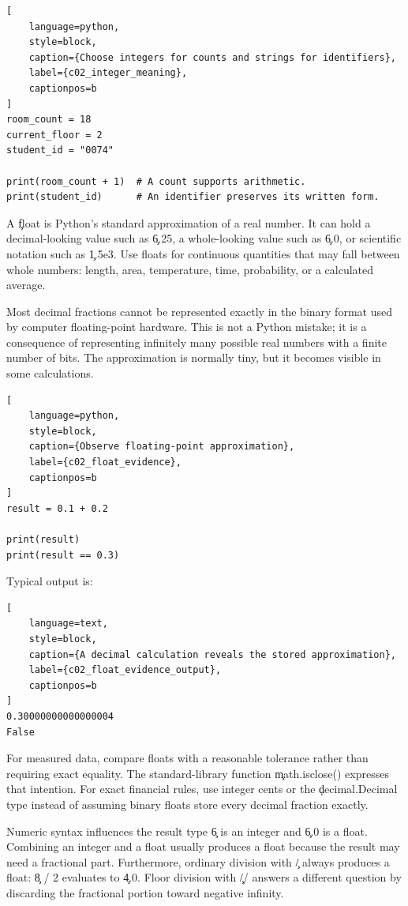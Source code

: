\begin{lstlisting}[
    language=python,
    style=block,
    caption={Choose integers for counts and strings for identifiers},
    label={c02_integer_meaning},
    captionpos=b
]
room_count = 18
current_floor = 2
student_id = "0074"

print(room_count + 1)  # A count supports arithmetic.
print(student_id)      # An identifier preserves its written form.
\end{lstlisting}


A \c{float} is Python's standard approximation of a real number. It can hold
a decimal-looking value such as \c{6.25}, a whole-looking value such as
\c{6.0}, or scientific notation such as \c{1.5e3}. Use floats for continuous
quantities that may fall between whole numbers: length, area, temperature,
time, probability, or a calculated average.

Most decimal fractions cannot be represented exactly in the binary format
used by computer floating-point hardware. This is not a Python mistake; it is
a consequence of representing infinitely many possible real numbers with a
finite number of bits. The approximation is normally tiny, but it becomes
visible in some calculations.

\begin{lstlisting}[
    language=python,
    style=block,
    caption={Observe floating-point approximation},
    label={c02_float_evidence},
    captionpos=b
]
result = 0.1 + 0.2

print(result)
print(result == 0.3)
\end{lstlisting}

Typical output is:

\begin{lstlisting}[
    language=text,
    style=block,
    caption={A decimal calculation reveals the stored approximation},
    label={c02_float_evidence_output},
    captionpos=b
]
0.30000000000000004
False
\end{lstlisting}

For measured data, compare floats with a reasonable tolerance rather than
requiring exact equality. The standard-library function \c{math.isclose()}
expresses that intention. For exact financial rules, use integer cents or the
\c{decimal.Decimal} type instead of assuming binary floats store every decimal
fraction exactly.

\begin{ExplainBox}{Numeric syntax influences the result type}
\c{6} is an integer and \c{6.0} is a float. Combining an integer and a float
usually produces a float because the result may need a fractional part.
Furthermore, ordinary division with \c{/} always produces a float:
\c{8 / 2} evaluates to \c{4.0}. Floor division with \c{//} answers a different
question by discarding the fractional portion toward negative infinity.
\end{ExplainBox}

